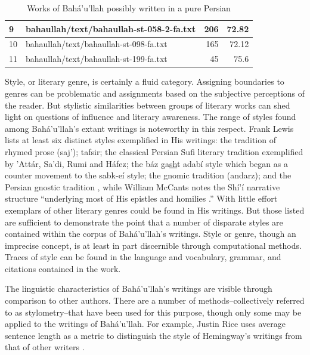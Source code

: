 \documentclass[12pt, oneside]{report}
\begin{document}
\begin{table}[]
\begin{tabular}{|l|l|r|r|}
		\rowcolor[HTML]{FFFFFF}
		9         & bahaullah/text/bahaullah-st-058-2-fa.txt & 206                         & 72.82                         \\ \hline
		\rowcolor[HTML]{EFEFEF}
		10        & bahaullah/text/bahaullah-st-098-fa.txt   & 165                         & 72.12                         \\ \hline
		\rowcolor[HTML]{FFFFFF}
		11        & bahaullah/text/bahaullah-st-199-fa.txt   & 45                          & 75.6                          \\ \hline
	\end{tabular}
	\caption{Works of Bah\'{a}'u'llah possibly written in a pure Persian }
	\label{tab:pure-persian}
\end{table}
\par
Style, or literary genre, is certainly a fluid category.
Assigning boundaries to genres can be problematic and assignments based on the subjective perceptions of the reader.
But stylistic similarities between groups of literary works can shed light on questions of influence and literary awareness.
The range of styles found among Bah\'{a}'u'llah's extant writings is noteworthy in this respect.
Frank Lewis lists at least six distinct styles exemplified in His writings: the tradition of rhymed prose (saj'); tafsir; the classical Persian Sufi literary tradition exemplified by 'Att\'{a}r, Sa'di, Rumi and H\'{a}fez; the b\'{a}z ga\underline{sh}t adab\'{i} style which began as a counter movement to the sabk-e\'{i} style; the gnomic tradition (andarz); and the Persian gnostic tradition \cite{lewis_frank_scripture_1997}, while William McCants notes the Sh\'{i}'\'{i} narrative structure ``underlying most of His epistles and homilies \cite{mccants_wronged_2002}.''
With little effort exemplars of other literary genres could be found in His writings.
But those listed are sufficient to demonstrate the point that a number of disparate styles are contained within the corpus of Bah\'{a}'u'llah's writings.
Style or genre, though an imprecise concept, is at least in part discernible through computational methods.
Traces of style can be found in the language and vocabulary, grammar, and citations contained in the work.
\par
The linguistic characteristics of Bah\'{a}'u'llah's writings are visible through comparison to other authors.
There are a number of methods–collectively referred to as stylometry–that have been used for this purpose, though only some may be applied to the writings of Bah\'{a}'u'llah.
For example, Justin Rice uses average sentence length as a metric to distinguish the style of Hemingway's writings from that of other writers \cite{justin_rice_what_2018}.
\end{document}
